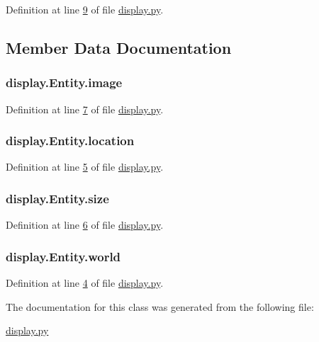 Definition at line \hyperlink{display_8py_source_l00009}{9} of file \hyperlink{display_8py_source}{display.\+py}.



\subsection{Member Data Documentation}
\hypertarget{classdisplay_1_1Entity_a244569c285ad924e6200d4c1c8b4639c}{
\subsubsection[{image}]{\setlength{\rightskip}{0pt plus 5cm}display.\+Entity.\+image}}\label{classdisplay_1_1Entity_a244569c285ad924e6200d4c1c8b4639c}


Definition at line \hyperlink{display_8py_source_l00007}{7} of file \hyperlink{display_8py_source}{display.\+py}.

\hypertarget{classdisplay_1_1Entity_ae2a1114b0c54ef7eb43c2bd6cd097258}{
\subsubsection[{location}]{\setlength{\rightskip}{0pt plus 5cm}display.\+Entity.\+location}}\label{classdisplay_1_1Entity_ae2a1114b0c54ef7eb43c2bd6cd097258}


Definition at line \hyperlink{display_8py_source_l00005}{5} of file \hyperlink{display_8py_source}{display.\+py}.

\hypertarget{classdisplay_1_1Entity_aa56fd9b8bb6c9510f24ea13be8c6a218}{
\subsubsection[{size}]{\setlength{\rightskip}{0pt plus 5cm}display.\+Entity.\+size}}\label{classdisplay_1_1Entity_aa56fd9b8bb6c9510f24ea13be8c6a218}


Definition at line \hyperlink{display_8py_source_l00006}{6} of file \hyperlink{display_8py_source}{display.\+py}.

\hypertarget{classdisplay_1_1Entity_ad7e3284bfb984c309b35d5a077bd5b21}{
\subsubsection[{world}]{\setlength{\rightskip}{0pt plus 5cm}display.\+Entity.\+world}}\label{classdisplay_1_1Entity_ad7e3284bfb984c309b35d5a077bd5b21}


Definition at line \hyperlink{display_8py_source_l00004}{4} of file \hyperlink{display_8py_source}{display.\+py}.



The documentation for this class was generated from the following file\+:\begin{DoxyCompactItemize}
\item 
\hyperlink{display_8py}{display.\+py}\end{DoxyCompactItemize}

